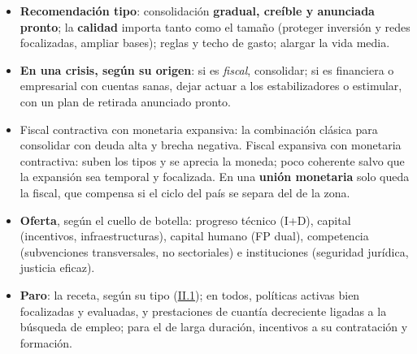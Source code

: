 \documentclass{article}
\begin{document}
\begin{columnas}
\begin{itemize}[itemsep=1.5pt]
\end{itemize}
\begin{itemize}[itemsep=1.5pt]
\item \textbf{Recomendación tipo}: consolidación \textbf{gradual, creíble y anunciada pronto}; la \textbf{calidad} importa tanto como el tamaño (proteger inversión y redes focalizadas, ampliar bases); reglas y techo de gasto; alargar la vida media.
\item \textbf{En una crisis, según su origen}: si es \emph{fiscal}, consolidar; si es financiera o empresarial con cuentas sanas, dejar actuar a los estabilizadores o estimular, con un plan de retirada anunciado pronto.
\end{itemize}

\begin{itemize}[itemsep=1.5pt]
\item Fiscal contractiva con monetaria expansiva: la combinación clásica para consolidar con deuda alta y brecha negativa. Fiscal expansiva con monetaria contractiva: suben los tipos y se aprecia la moneda; poco coherente salvo que la expansión sea temporal y focalizada. En una \textbf{unión monetaria} solo queda la fiscal, que compensa si el ciclo del país se separa del de la zona.
\item \textbf{Oferta}, según el cuello de botella: progreso técnico (I+D), capital (incentivos, infraestructuras), capital humano (FP dual), competencia (subvenciones transversales, no sectoriales) e instituciones (seguridad jurídica, justicia eficaz).
\item \textbf{Paro}: la receta, según su tipo (\hyperref[rep:II.1]{II.1}); en todos, políticas activas bien focalizadas y evaluadas, y prestaciones de cuantía decreciente ligadas a la búsqueda de empleo; para el de larga duración, incentivos a su contratación y formación.
\end{itemize}


\end{columnas}
\end{document}
